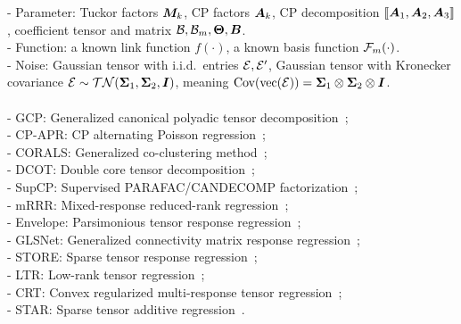 \documentclass[12pt]{article}
\theoremstyle{definition}
\theoremstyle{definition}
\begin{document}
{{\begin{landscape}
\begin{table}[h!]
{- Parameter: Tuckor factors $\bm M_k$, CP factors $\bm A_k$, CP decomposition $\llbracket \bm A_1, \bm A_2, \bm A_3 \rrbracket$, coefficient tensor and matrix $\mathcal{B}, \mathcal{B}_m, {\bf \Theta}, \bm B$.\\
- Function: a known link function $f(\cdot)$, a known basis function $\mathcal{F}_m(\cdot)$. \\
- Noise: Gaussian tensor with i.i.d.\ entries $\mathcal{E}, \mathcal{E}'$, Gaussian tensor with Kronecker covariance $\mathcal{E} \sim \mathcal{TN}(\bm \Sigma_1, \bm \Sigma_2, \bm I)$, meaning $\text{Cov}(\text{vec}(\mathcal{E}))=\bm \Sigma_1\otimes\bm \Sigma_2\otimes \bm I$.\\
\vspace{-0.1cm}\\
- GCP: Generalized canonical polyadic tensor decomposition~\citep{hong2020generalized};\\
- CP-APR: CP alternating Poisson regression~\citep{chi2012tensors};\\
- CORALS: Generalized co-clustering method~\citep{li2020generalized};\\
- DCOT: Double core tensor decomposition~\citep{tarzanagh2019regularized};\\
- SupCP: Supervised PARAFAC/CANDECOMP factorization~\citep{lock2018supervised};\\
- mRRR: Mixed-response reduced-rank regression~\citep{luo2018leveraging};\\
- Envelope: Parsimonious tensor response regression~\citep{li2017parsimonious};\\
- GLSNet: Generalized connectivity matrix response regression~\citep{zhang2018network};\\
- STORE: Sparse tensor response regression~\citep{sun2017store};\\
- LTR: Low-rank tensor regression~\citep{han2020optimal};\\
- CRT: Convex regularized multi-response tensor regression~\citep{raskutti2019convex};\\
- STAR: Sparse tensor additive regression~\citep{hao2019sparse}.
}\label{table:comp_table}
\end{table}
\end{landscape}
}
}
\end{document}
